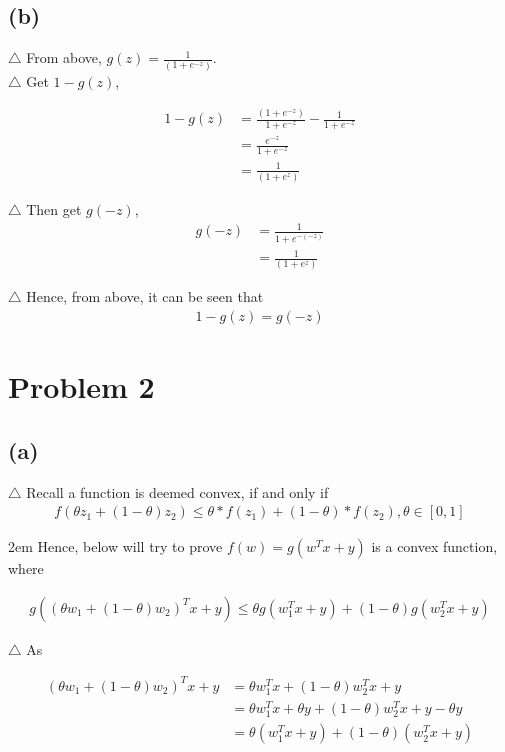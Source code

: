 \documentclass[a4paper,12pt]{article}
\begin{document}
\subsection*{(b)}
\noindent $\triangle$
From above, $g(z) = \frac{1}{(1+e^{-z})}$. \\
\noindent $\triangle$
Get $1-g(z)$,

\begin{align*}
   1-g(z) &= \frac{(1+e^{-z})}{1+e^{-z}} - \frac{1}{1+e^{-z}} \\
   &=\frac{e^{-z}}{1+e^{-z}} \\
   &=\frac{1}{(1+e^{z})}
\end{align*} 

\noindent $\triangle$
Then get $g(-z)$,
\begin{align*}
   g(-z) &= \frac{1}{1+e^{-(-z)}}\\
   &=\frac{1}{(1+e^{z})}
\end{align*} 

\noindent $\triangle$
Hence, from above, it can be seen that
\begin{align*}
   1-g(z) = g(-z)
\end{align*} 

\section*{Problem 2}
\subsection*{(a)}
\noindent $\triangle$ 
Recall a function is deemed convex, if and only if 
\begin{align*}
   f(\theta z_{1} + (1-\theta) z_{2}) 
      \leq 
   \theta * f(z_{1}) + (1 - \theta) * f(z_{2}), 
   \theta \in [0,1]
\end{align*} 

\hangindent2em
\noindent Hence, below will try to prove 
$f(w) = g(w^{T}x + y)$ is a convex function,
where

\begin{align*}
   g( (\theta w_{1} + (1-\theta) w_{2})^{T}x + y) \leq 
   \theta g(w_{1}^{T}x + y) +  (1-\theta) g(w_{2}^{T}x + y)
\end{align*}

\noindent $\triangle$ 
As 

\begin{align*}
   (\theta w_{1} + (1-\theta) w_{2})^{T}x + y &=
   \theta w_{1}^{T}x + (1-\theta) w_{2}^{T}x + y \\
   &= \theta w_{1}^{T}x + \theta y + (1-\theta) w_{2}^{T}x + y - \theta y \\
   &= \theta (w_{1}^{T}x + y) + (1-\theta) (w_{2}^{T}x + y)
\end{align*}
\end{document}
